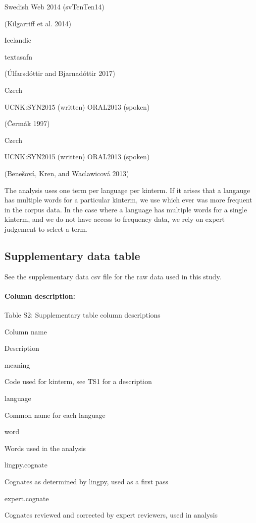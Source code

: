 \documentclass[]{article}
\let\oldparagraph\paragraph
\renewcommand{\paragraph}[1]{\oldparagraph{#1}\mbox{}}
\begin{document}
Swedish Web 2014 (svTenTen14)

(Kilgarriff et al. 2014)

Icelandic

textasafn

(Úlfarsdóttir and Bjarnadóttir 2017)

Czech

UCNK:SYN2015 (written) ORAL2013 (spoken)

(Čermák 1997)

Czech

UCNK:SYN2015 (written) ORAL2013 (spoken)

(Benešová, Kren, and Waclawicová 2013)

The analysis uses one term per language per kinterm. If it arises that a
langauge has multiple words for a particular kinterm, we use which ever
was more frequent in the corpus data. In the case where a language has
multiple words for a single kinterm, and we do not have access to
frequency data, we rely on expert judgement to select a term.

\subsection{Supplementary data table}\label{supplementary-data-table}

See the supplementary data csv file for the raw data used in this study.

\paragraph{Column description:}\label{column-description}

Table S2: Supplementary table column descriptions

Column name

Description

meaning

Code used for kinterm, see TS1 for a description

language

Common name for each language

word

Words used in the analysis

lingpy.cognate

Cognates as determined by lingpy, used as a first pass

expert.cognate

Cognates reviewed and corrected by expert reviewers, used in analysis
\end{document}
